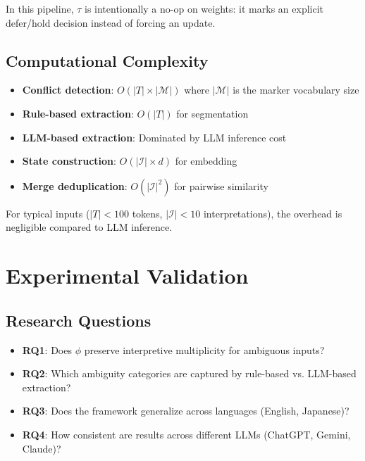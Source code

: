 \documentclass[11pt,a4paper]{article}
\begin{document}
In this pipeline, $\tau$ is intentionally a no-op on weights: it marks
an explicit defer/hold decision instead of forcing an update.

\subsection{Computational Complexity}

\begin{itemize}
    \item \textbf{Conflict detection}: $O(|T| \times |\mathcal{M}|)$ where $|\mathcal{M}|$ 
          is the marker vocabulary size
    \item \textbf{Rule-based extraction}: $O(|T|)$ for segmentation
    \item \textbf{LLM-based extraction}: Dominated by LLM inference cost
    \item \textbf{State construction}: $O(|\mathcal{I}| \times d)$ for embedding
    \item \textbf{Merge deduplication}: $O(|\mathcal{I}|^2)$ for pairwise similarity
\end{itemize}

For typical inputs ($|T| < 100$ tokens, $|\mathcal{I}| < 10$ interpretations), 
the overhead is negligible compared to LLM inference.

\section{Experimental Validation}
\label{sec:experiments}

\subsection{Research Questions}

\begin{itemize}
    \item \textbf{RQ1}: Does $\phi$ preserve interpretive multiplicity for ambiguous inputs?
    \item \textbf{RQ2}: Which ambiguity categories are captured by rule-based vs. LLM-based extraction?
    \item \textbf{RQ3}: Does the framework generalize across languages (English, Japanese)?
    \item \textbf{RQ4}: How consistent are results across different LLMs (ChatGPT, Gemini, Claude)?
\end{itemize}
\end{document}
